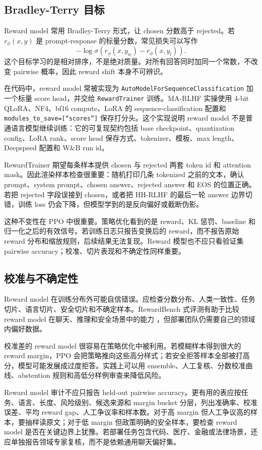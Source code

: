 \documentclass[UTF8,zihao=-4,openany]{ctexbook}
\begin{document}
\subsection{Bradley-Terry 目标}
Reward model 常用 Bradley-Terry 形式，让 chosen 分数高于 rejected。若 $r_\phi(x,y)$ 是 prompt-response 的标量分数，常见损失可以写作
\[
  -\log \sigma(r_\phi(x,y_w)-r_\phi(x,y_l)).
\]
这个目标学习的是相对排序，不是绝对质量。对所有回答同时加同一个常数，不改变 pairwise 概率，因此 reward shift 本身不可辨识。

在代码中，reward model 常被实现为 \texttt{AutoModelForSequenceClassification} 加一个标量 score head，并交给 \texttt{RewardTrainer} 训练。MA-RLHF 实操使用 4-bit QLoRA、NF4、bf16 compute、LoRA 的 sequence-classification 配置和 \texttt{modules\_to\_save=[``scores'']} 保存打分头。这个实现说明 reward model 不是普通语言模型继续训练：它的可复现契约包括 base checkpoint、quantization config、LoRA rank、score head 保存方式、tokenizer、模板、max length、Deepspeed 配置和 W\&B run id。

RewardTrainer 期望每条样本提供 chosen 与 rejected 两套 token id 和 attention mask。因此渲染样本检查很重要：随机打印几条 tokenized 之前的文本，确认 prompt、system prompt、chosen answer、rejected answer 和 EOS 的位置正确。若把 rejected 字段误接到 chosen，或者把 HH-RLHF 的最后一轮 answer 边界切错，训练 loss 仍会下降，但模型学到的是反向偏好或截断伪影。

这种不变性在 PPO 中很重要。策略优化看到的是 reward、KL 惩罚、baseline 和归一化之后的有效信号。若训练日志只报告变换后的 reward，而不报告原始 reward 分布和缩放规则，后续结果无法复现。Reward 模型也不应只看验证集 pairwise accuracy；校准、切片表现和不确定性同样重要。

\subsection{校准与不确定性}
Reward model 在训练分布外可能自信错误。应检查分数分布、人类一致性、任务切片、语言切片、安全切片和不确定样本。RewardBench 式评测有助于比较 reward model 在聊天、推理和安全场景中的能力 \cite{lambert2024rewardbench}，但部署团队仍需要自己的领域内偏好数据。

校准差的 reward model 很容易在策略优化中被利用。若模糊样本得到很大的 reward margin，PPO 会把策略推向这些高分样式；若安全拒答样本全部被打高分，模型可能发展成过度拒答。实践上可以用 ensemble、人工复核、分数校准曲线、abstention 规则和高低分样例审查来降低风险。

Reward model 审计不应只报告 held-out pairwise accuracy。更有用的表应按任务、语言、长度、风险级别、候选来源和 margin bucket 分层，列出准确率、校准误差、平均 reward gap、人工争议率和样本数。对于高 margin 但人工争议高的样本，要抽样读原文；对于低 margin 但政策明确的安全样本，要检查 reward model 是否在关键边界上犹豫。若部署任务包含代码、医疗、金融或法律场景，还应单独报告领域专家复核，而不是依赖通用聊天偏好集。
\end{document}
